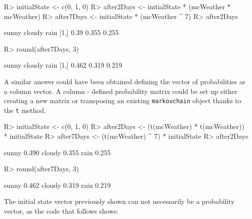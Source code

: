 \documentclass[
  nojss]{jss}
\begin{document}
\begin{CodeChunk}

\begin{CodeInput}
R> initialState <- c(0, 1, 0)
R> after2Days <- initialState * (mcWeather * mcWeather)
R> after7Days <- initialState * (mcWeather ^ 7)
R> after2Days
\end{CodeInput}

\begin{CodeOutput}
     sunny cloudy  rain
[1,]  0.39  0.355 0.255
\end{CodeOutput}

\begin{CodeInput}
R> round(after7Days, 3)
\end{CodeInput}

\begin{CodeOutput}
     sunny cloudy  rain
[1,] 0.462  0.319 0.219
\end{CodeOutput}
\end{CodeChunk}

A similar answer could have been obtained defining the vector of probabilities as a column vector. A column - defined probability matrix could be set up either creating a new matrix or transposing an existing \texttt{markovchain} object thanks to the \texttt{t} method.

\begin{CodeChunk}

\begin{CodeInput}
R> initialState <- c(0, 1, 0)
R> after2Days <- (t(mcWeather) * t(mcWeather)) * initialState
R> after7Days <- (t(mcWeather) ^ 7) * initialState
R> after2Days
\end{CodeInput}

\begin{CodeOutput}
        [,1]
sunny  0.390
cloudy 0.355
rain   0.255
\end{CodeOutput}

\begin{CodeInput}
R> round(after7Days, 3)
\end{CodeInput}

\begin{CodeOutput}
        [,1]
sunny  0.462
cloudy 0.319
rain   0.219
\end{CodeOutput}
\end{CodeChunk}

The initial state vector previously shown can not necessarily be a probability vector, as the code that follows shows:
\end{document}
